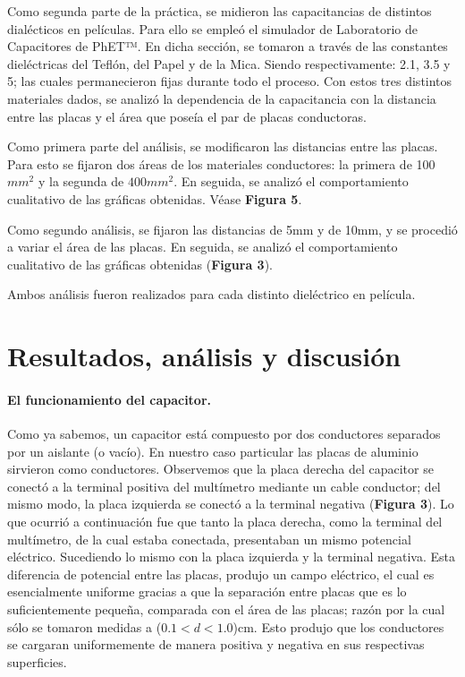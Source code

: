 \documentclass[letterpaper, 11 pt]{article}
\begin{document}
\begin{multicols}{2}
Como segunda parte de la práctica, se midieron las capacitancias de distintos dialécticos en películas. Para ello se empleó el simulador de Laboratorio de Capacitores de PhET™. 
En dicha sección, se tomaron a través de \cite{burb2007} las constantes dieléctricas del Teflón, del Papel y de la Mica. Siendo respectivamente: 2.1, 3.5 y 5; las cuales permanecieron fijas durante todo el proceso. Con estos tres distintos materiales dados, se analizó la dependencia de la capacitancia con la distancia entre las placas y el área que poseía el par de placas conductoras. 

Como primera parte del análisis, se modificaron las distancias entre las placas. Para esto se fijaron dos áreas de los materiales conductores: la primera de 100$mm^2$ y la segunda de $400mm^2$. En seguida, se analizó el comportamiento cualitativo de las gráficas obtenidas.  Véase \textbf{Figura 5}.

Como segundo análisis, se fijaron las distancias de 5mm y de 10mm, y se procedió a variar el área de las placas. En seguida, se analizó el comportamiento cualitativo de las gráficas obtenidas (\textbf{Figura 3}).

Ambos análisis fueron realizados para cada distinto dieléctrico en película. 



\section{Resultados, análisis y discusión}
\paragraph{El funcionamiento del capacitor. } 
Como ya sabemos, un capacitor está compuesto por dos conductores separados por un aislante (o vacío). En nuestro caso particular las placas de aluminio sirvieron como conductores. Observemos que la placa derecha del capacitor se conectó a la terminal positiva del multímetro mediante un cable conductor; del mismo modo, la placa izquierda se conectó a la terminal negativa (\textbf{Figura 3}). Lo que ocurrió a continuación fue que tanto la placa derecha, como la terminal del multímetro, de la cual estaba conectada, presentaban un mismo potencial eléctrico. Sucediendo lo mismo con la placa izquierda y la terminal negativa. Esta diferencia de potencial entre las placas, produjo un campo eléctrico, el cual es esencialmente uniforme gracias a que la separación entre placas que es lo suficientemente pequeña, comparada con el área de las placas; razón por la cual sólo se tomaron medidas a ($0.1<d<1.0$)cm. Esto produjo que los conductores se cargaran uniformemente de manera positiva y negativa en sus respectivas superficies.


\end{multicols}
\end{document}
